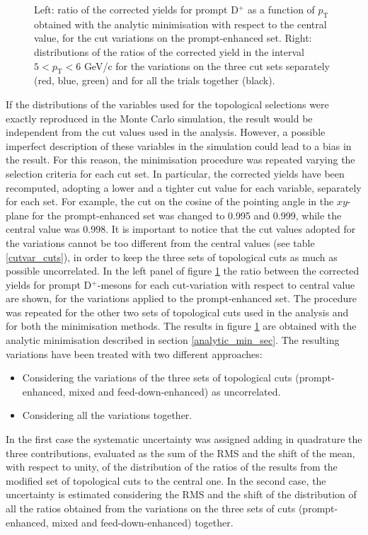 \documentclass[b5paper,10pt,twoside,oldstyle,classica]{toptesi}
\newcommand{\pt}{p_\text{T}}
\begin{document}
\begin{figure}[tb]
\begin{center}
\caption{Left: ratio of the corrected yields for prompt D$^+$ as a function of $\pt$ obtained with the analytic minimisation with respect to the central value, for the cut variations on the prompt-enhanced set. Right: distributions of the ratios of the corrected yield in the interval $5<\pt<6$ GeV/c for the variations on the three cut sets separately (red, blue, green) and for all the trials together (black).}
\label{cutvar_prompt_cutsyst}
\end{center}
\end{figure} If the distributions of the variables used for the topological selections were exactly reproduced in the Monte Carlo simulation, the result would be independent from the cut values used in the analysis. However, a possible imperfect description of these variables in the simulation could lead to a bias in the result. For this reason, the minimisation procedure was repeated varying the selection criteria for each cut set. In particular, the corrected yields have been recomputed, adopting a lower and a tighter cut value for each variable, separately for each set. For example, the cut on the cosine of the pointing angle in the $xy$-plane for the prompt-enhanced set was changed to 0.995 and 0.999, while the central value was 0.998. It is important to notice that the cut values adopted for the variations cannot be too different from the central values (see table \ref{cutvar_cuts}), in order to keep the three sets of topological cuts as much as possible uncorrelated. In the left panel of figure \ref{cutvar_prompt_cutsyst} the ratio between the corrected yields for prompt D$^+$-mesons for each cut-variation with respect to central value are shown, for the variations applied to the prompt-enhanced set. The procedure was repeated for the other two sets of topological cuts used in the analysis and for both the minimisation methods. The results in figure \ref{cutvar_prompt_cutsyst} are obtained with the analytic minimisation described in section \ref{analytic_min_sec}. The resulting variations have been treated with two different approaches:
\begin{itemize}
 \item Considering the variations of the three sets of topological cuts (prompt-enhanced, mixed and feed-down-enhanced) as uncorrelated. 
 \item Considering all the variations together. 
\end{itemize}
In the first case the systematic uncertainty was assigned adding in quadrature the three contributions, evaluated as the sum of the RMS and the shift of the mean, with respect to unity, of the distribution of the ratios of the results from the modified set of topological cuts to the central one. In the second case, the uncertainty is estimated considering the RMS and the shift of the distribution of all the ratios obtained from the variations on the three sets of cuts (prompt-enhanced, mixed and feed-down-enhanced) together. 
\end{document}
